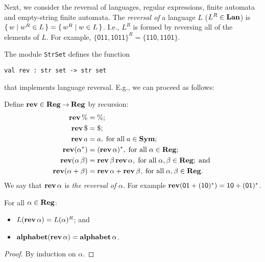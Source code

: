 Next, we consider the reversal of languages, regular expressions,
finite automata and empty-string finite automata.
The \emph{reversal of}
%
%
a language $L$ ($L^R\in\mathbf{Lan}$)
%
%
is $\{ \, w \mid w^R\in L \, \} = \{ \, w^R \mid w\in L \, \}$.  I.e., $L^R$ is formed
by reversing all of the elements of $L$.  For example, $\{\mathsf{011,
1011}\}^R = \{\mathsf{110, 1101}\}$.

The module \texttt{StrSet}
%
defines the function
\begin{verbatim}
val rev : str set -> str set
\end{verbatim}
%
that implements language reversal. E.g., we can
proceed as follows:


Define $\mathbf{rev}\in\mathbf{Reg}\mathbin{\to}\mathbf{Reg}$ by recursion:
%
%
%
%
\begin{align*}
\mathbf{rev}\,\% &= \%; \\
\mathbf{rev}\,\$ &= \$; \\
\mathbf{rev}\,a &= a, \;\allowbreak\mbox{for all}\allowbreak\;a\in\mathbf{Sym}; \\
\mathbf{rev}(\alpha^*) &= (\mathbf{rev}\,\alpha)^*, \;\allowbreak\mbox{for all}\allowbreak\;\alpha\in\mathbf{Reg};\\
\mathbf{rev}(\alpha\,\beta) &= \mathbf{rev}\,\beta\,\mathbf{rev}\,\alpha ,
\;\allowbreak\mbox{for all}\allowbreak\;\alpha,\beta\in\mathbf{Reg}; \;\allowbreak\mbox{and}\allowbreak\; \\
\mathbf{rev}(\alpha+\beta) &= \mathbf{rev}\,\alpha + \mathbf{rev}\,\beta ,
\;\allowbreak\mbox{for all}\allowbreak\;\alpha,\beta\in\mathbf{Reg} .
\end{align*}
We say that $\mathbf{rev}\,\alpha$ is \emph{the reversal of} $\alpha$.
For example $\mathbf{rev}(\mathsf{01+(10)^*}) = \mathsf{10 + (01)^*}$.

\begin{theorem}
\label{RegExpRev}
For all $\alpha\in\mathbf{Reg}$:
\begin{itemize}
\item $L(\mathbf{rev}\,\alpha) = L(\alpha)^R$; and

\item $\mathbf{alphabet}(\mathbf{rev}\,\alpha) = \mathbf{alphabet}\,\alpha$.
\end{itemize}
\end{theorem}

\begin{proof}
By induction on $\alpha$.
\end{proof}

